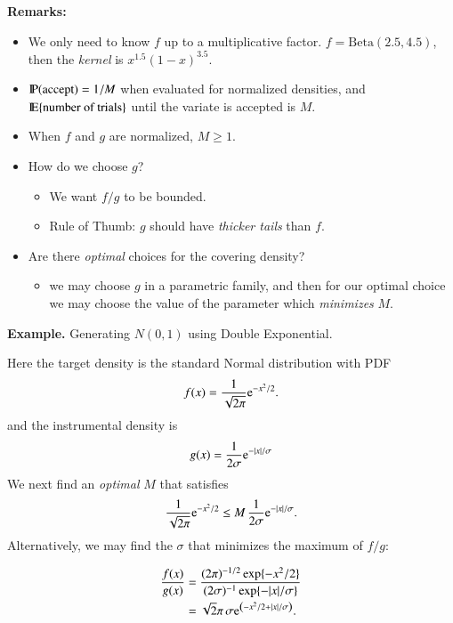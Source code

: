 \documentclass[11pt,english]{scrbook}
\begin{document}
\textbf{Remarks:}
\begin{itemize}
\item We only need to know \(f\) up to a multiplicative factor.
\(f=\mathrm{Beta}(2.5,4.5)\), then the \emph{kernel} is \(x^{1.5}(1-x)^{3.5}\).

\item \(\P(\mbox{accept})=1/M\) when evaluated for normalized densities, and \newline \(\E\{\mbox{number of trials}\}\) until the variate is accepted is \(M\).

\item When \(f\) and \(g\) are normalized, \(M \geq 1\).
\item How do we choose \(g\)?
\begin{itemize}
\item We want \(f/g\) to be bounded.
\item Rule of Thumb: \(g\) should have \emph{thicker tails} than \(f\).
\end{itemize}
\item Are there \emph{optimal} choices for the covering density?
\begin{itemize}
\item we may choose \(g\) in a parametric family, and then for our optimal choice we may choose the value of the parameter which \emph{minimizes} \(M\).
\end{itemize}
\end{itemize}


\textbf{Example.} Generating \(N(0,1)\) using Double Exponential.

Here the target density is the standard Normal distribution with PDF
\[
f(x)=\frac{1}{\sqrt{2\pi}}\me^{-x^{2}/2}.
\]
and the instrumental density is 
\[
g(x)=\frac{1}{2\sigma}\me^{-|x|/\sigma}
\]
We next find an \emph{optimal} \(M\) that satisfies 
\[
\frac{1}{\sqrt{2\pi}}\me^{-x^{2}/2}\leq M\,\frac{1}{2\sigma}\me^{-|x|/\sigma}.
\]
Alternatively, we may find the \(\sigma\) that minimizes the maximum of \(f/g\):

\begin{align*}
\frac{f(x)}{g(x)} & =\frac{(2\pi)^{-1/2}\exp\{-x^{2}/2\}}{(2\sigma)^{-1}\exp\{-|x|/\sigma\}}\\
 & =\sqrt{2}{\pi}\,\sigma \me^{\left(-x^{2}/2+|x|/\sigma\right)}.
\end{align*}
\end{document}
